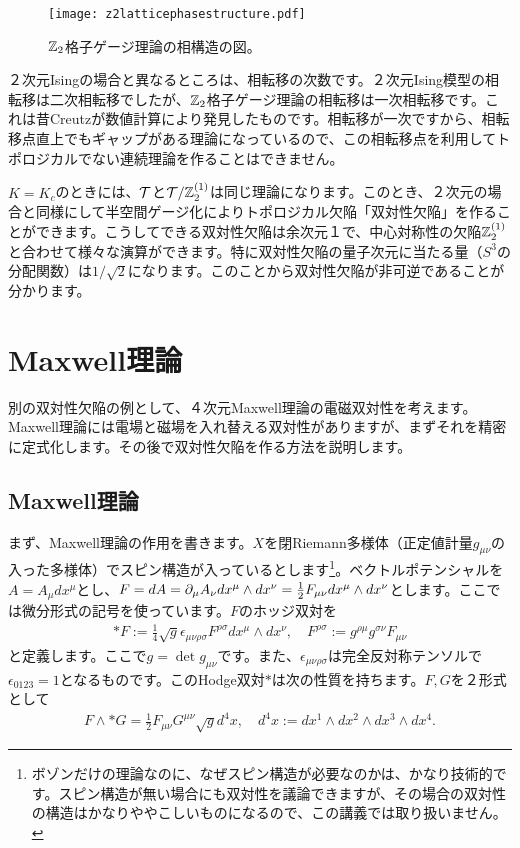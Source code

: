 \documentclass[generalized_symmetry.tex]{subfiles}
\begin{document}
\begin{figure}[htbp]
  \centering
  \texttt{[image: z2latticephasestructure.pdf]}
  \caption{$\mbox{$\mathbb{Z}_{2}$}$格子ゲージ理論の相構造の図。}
  \label{fig:z2latticephasestructure}
\end{figure}

２次元Isingの場合と異なるところは、相転移の次数です。２次元Ising模型の相転移は二次相転移でしたが、$\mbox{$\mathbb{Z}_{2}$}$格子ゲージ理論の相転移は一次相転移です。これは昔Creutzが数値計算により発見したものです。相転移が一次ですから、相転移点直上でもギャップがある理論になっているので、この相転移点を利用してトポロジカルでない連続理論を作ることはできません。

$K=K_c$のときには、$\mathcal{T}$と$\mathcal{T}/\mathbb{Z}_{2}^{(1)}$は同じ理論になります。このとき、２次元の場合と同様にして半空間ゲージ化によりトポロジカル欠陥「双対性欠陥」を作ることができます。こうしてできる双対性欠陥は余次元１で、中心対称性の欠陥$\mathbb{Z}_{2}^{(1)}$と合わせて様々な演算ができます。特に双対性欠陥の量子次元に当たる量（$S^3$の分配関数）は$1/\sqrt{2}$になります。このことから双対性欠陥が非可逆であることが分かります。

\section{Maxwell理論}

別の双対性欠陥の例として、４次元Maxwell理論の電磁双対性を考えます。Maxwell理論には電場と磁場を入れ替える双対性がありますが、まずそれを精密に定式化します。その後で双対性欠陥を作る方法を説明します。

\subsection{Maxwell理論}
まず、Maxwell理論の作用を書きます。$X$を閉Riemann多様体（正定値計量$g_{\mu\nu}$の入った多様体）でスピン構造が入っているとします\footnote{ボゾンだけの理論なのに、なぜスピン構造が必要なのかは、かなり技術的です。スピン構造が無い場合にも双対性を議論できますが、その場合の双対性の構造はかなりややこしいものになるので、この講義では取り扱いません。}。ベクトルポテンシャルを$A=A_{\mu}dx^{\mu}$とし、$F=dA=\partial_{\mu}A_{\nu}dx^{\mu}\wedge dx^{\nu}=\frac{1}{2}F_{\mu\nu}dx^{\mu}\wedge dx^{\nu}$とします。ここでは微分形式の記号を使っています。$F$のホッジ双対を
\begin{align}
  *F:=\frac{1}{4}\sqrt{g}\epsilon_{\mu\nu\rho\sigma}F^{\rho\sigma}dx^{\mu}\wedge dx^{\nu},\quad
  F^{\rho\sigma}:=g^{\rho\mu}g^{\sigma\nu}F_{\mu\nu}
\end{align}
と定義します。ここで$g=\det g_{\mu\nu}$です。また、$\epsilon_{\mu\nu\rho\sigma}$は完全反対称テンソルで$\epsilon_{0123}=1$となるものです。このHodge双対$*$は次の性質を持ちます。$F,G$を２形式として
\begin{align}
  F\wedge *G = \frac{1}{2}F_{\mu\nu}G^{\mu\nu} \sqrt{g}d^4x,\quad d^4x :=dx^{1}\wedge dx^{2}\wedge dx^{3}\wedge dx^{4}.
\end{align}
\end{document}
